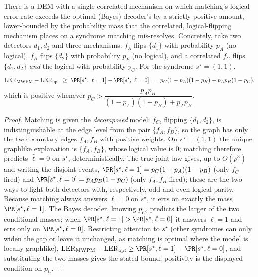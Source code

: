 \begin{proposition}
\label{prop:separation}
There is a DEM with a single correlated mechanism on which matching's logical
error rate exceeds the optimal (Bayes) decoder's by a strictly positive amount,
lower-bounded by the probability mass that the correlated, logical-flipping
mechanism places on a syndrome matching mis-resolves. Concretely, take two
detectors $d_1,d_2$ and three mechanisms: $f_A$ flips $\{d_1\}$ with probability
$p_A$ (no logical), $f_B$ flips $\{d_2\}$ with probability $p_B$ (no logical),
and a correlated $f_C$ flips $\{d_1,d_2\}$ \emph{and} the logical with
probability $p_C$. For the syndrome $s^\star=(1,1)$,
\[
  \mathrm{LER}_{\mathrm{MWPM}}-\mathrm{LER}_{\mathrm{opt}}\;\ge\;
  \PR[s^\star,\ \ell=1]-\PR[s^\star,\ \ell=0]
  \;=\;p_C(1-p_A)(1-p_B)-p_Ap_B(1-p_C),
\]
which is positive whenever $p_C>\dfrac{p_Ap_B}{(1-p_A)(1-p_B)+p_Ap_B}$.
\end{proposition}

\begin{proof}
Matching is given the \emph{decomposed} model: $f_C$, flipping $\{d_1,d_2\}$, is
indistinguishable at the edge level from the pair $\{f_A,f_B\}$, so the graph has
only the two boundary edges $f_A,f_B$ with positive weights. On $s^\star=(1,1)$
the unique graphlike explanation is $\{f_A,f_B\}$, whose logical value is $0$;
matching therefore predicts $\hat\ell=0$ on $s^\star$, deterministically. The
true joint law gives, up to $O(p^3)$ and writing the disjoint events,
$\PR[s^\star,\ell=1]=p_C(1-p_A)(1-p_B)$ (only $f_C$ fired) and
$\PR[s^\star,\ell=0]=p_Ap_B(1-p_C)$ (only $f_A,f_B$ fired); these are the two
ways to light both detectors with, respectively, odd and even logical parity.
Because matching always answers $\ell=0$ on $s^\star$, it errs on exactly the
mass $\PR[s^\star,\ell=1]$. The Bayes decoder, knowing $p_C$, predicts the
larger of the two conditional masses; when
$\PR[s^\star,\ell=1]>\PR[s^\star,\ell=0]$ it answers $\ell=1$ and errs only on
$\PR[s^\star,\ell=0]$. Restricting attention to $s^\star$ (other syndromes can
only widen the gap or leave it unchanged, as matching is optimal where the model
is locally graphlike),
$\mathrm{LER}_{\mathrm{MWPM}}-\mathrm{LER}_{\mathrm{opt}}\ge
\PR[s^\star,\ell=1]-\PR[s^\star,\ell=0]$, and substituting the two masses gives
the stated bound; positivity is the displayed condition on $p_C$.
\end{proof}

